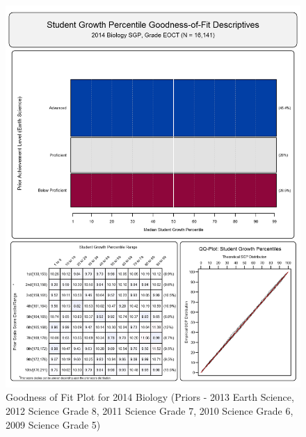 \documentclass[12pt]{article}
\begin{document}
\begin{figure}[htbp]
\centering
\includegraphics{../img/Goodness_of_Fit/BIOLOGY.2014/2014_BIOLOGY_EOCT;2013_EARTH_SCIENCE_EOCT;2012_SCIENCE_8;2011_SCIENCE_7;2010_SCIENCE_6;2009_SCIENCE_5.png}
\caption{Goodness of Fit Plot for 2014 Biology (Priors - 2013 Earth
Science, 2012 Science Grade 8, 2011 Science Grade 7, 2010 Science Grade
6, 2009 Science Grade 5)}
\end{figure}
\end{document}
